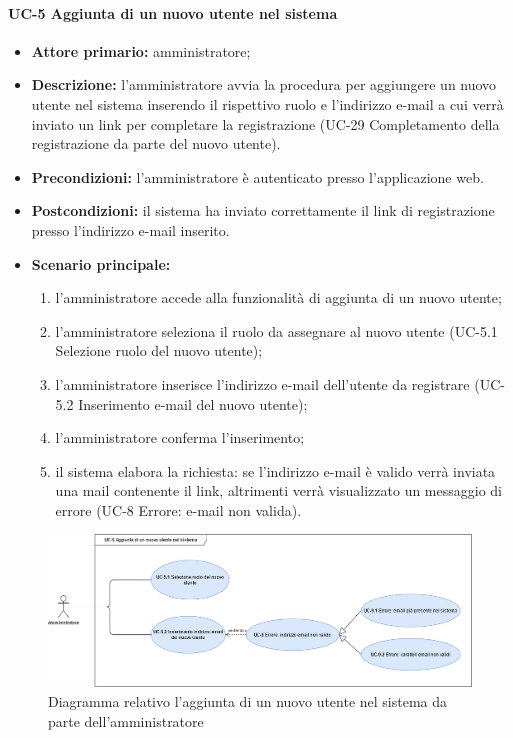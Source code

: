 \paragraph{UC-5 Aggiunta di un nuovo utente nel sistema}
\begin{itemize}
    \item \textbf{Attore primario:} amministratore; 

    \item \textbf{Descrizione:} l'amministratore avvia la procedura per aggiungere un nuovo utente nel sistema inserendo il rispettivo ruolo e l'indirizzo e-mail a cui verrà inviato un link per completare la registrazione (UC-29 Completamento della registrazione da parte del nuovo utente).

    \item \textbf{Precondizioni:} l'amministratore è  autenticato presso l'applicazione web.

    \item \textbf{Postcondizioni:} il sistema ha inviato correttamente il link di registrazione presso l'indirizzo e-mail inserito.

    \item \textbf{Scenario principale:}
          \begin{enumerate}
              \item l'amministratore accede alla funzionalità di aggiunta di un nuovo utente;
              \item l'amministratore seleziona il ruolo da assegnare al nuovo utente (UC-5.1 Selezione ruolo del nuovo utente);
              \item l'amministratore inserisce l'indirizzo e-mail dell'utente da registrare (UC-5.2 Inserimento e-mail del nuovo utente);
              \item l'amministratore conferma l'inserimento;
              \item il sistema elabora la richiesta: se l'indirizzo e-mail è valido verrà inviata una mail contenente il link, altrimenti verrà visualizzato un messaggio di errore (UC-8 Errore: e-mail non valida).
          \end{enumerate}
\end{itemize}
\begin{figure}[H]
    \centering
      \includegraphics[scale=0.35]{src/CasiDUso/immagini/NuovoUtenteAdmin.png}
    \caption{Diagramma relativo l'aggiunta di un nuovo utente nel sistema da parte dell'amministratore}
\end{figure}

